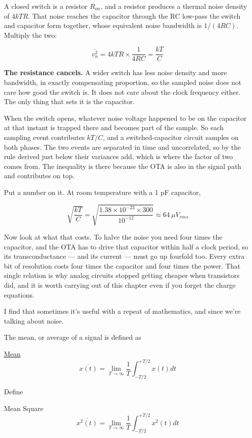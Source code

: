 A closed switch is a resistor \(R_{on}\), and a resistor produces a
thermal noise density of \(4kTR\). That noise reaches the capacitor
through the RC low-pass the switch and capacitor form together, whose
equivalent noise bandwidth is \(1/(4RC)\). Multiply the two:

\[ \overline{v_n^2} = 4kTR \times \frac{1}{4RC} = \frac{kT}{C} \]

\textbf{The resistance cancels.} A wider switch has less noise density
and more bandwidth, in exactly compensating proportion, so the sampled
noise does not care how good the switch is. It does not care about the
clock frequency either. The only thing that sets it is the capacitor.

When the switch opens, whatever noise voltage happened to be on the
capacitor at that instant is trapped there and becomes part of the
sample. So each sampling event contributes \(kT/C\), and a
switched-capacitor circuit samples on both phases. The two events are
separated in time and uncorrelated, so by the rule derived just below
their variances add, which is where the factor of two comes from. The
inequality is there because the OTA is also in the signal path and
contributes on top.

Put a number on it. At room temperature with a 1 pF capacitor,

\[ \sqrt{\frac{kT}{C}} = \sqrt{\frac{1.38\times10^{-23} \times 300}{10^{-12}}} \approx 64\ \mu V_{rms} \]

Now look at what that costs. To halve the noise you need four times the
capacitor, and the OTA has to drive that capacitor within half a clock
period, so its transconductance --- and its current --- must go up
fourfold too. Every extra bit of resolution costs four times the
capacitor and four times the power. That single relation is why analog
circuits stopped getting cheaper when transistors did, and it is worth
carrying out of this chapter even if you forget the charge equations.

I find that sometimes it's useful with a repeat of mathematics, and
since we're talking about noise.

The mean, or average of a signal is defined as

\href{https://en.wikipedia.org/wiki/Mean}{Mean}
\[ \overline{x(t)} = \lim_{T\to\infty} \frac{1}{T}\int^{+T/2}_{-T/2}{ x(t) dt} \]

Define

Mean Square
\[ \overline{x^2(t)} = \lim_{T\to\infty} \frac{1}{T}\int^{+T/2}_{-T/2}{ x^2(t) dt} \]

